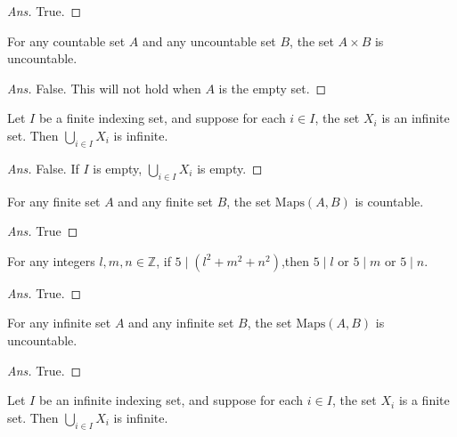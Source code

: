 \documentclass[12pt]{article}
\newenvironment{problem}[2][Problem]{\begin{trivlist}
\item[\hskip \labelsep {\bfseries #1}\hskip \labelsep {\bfseries #2.}]}{\end{trivlist}}
\begin{document}
\begin{proof}[Ans]
True.
\end{proof}

\begin{problem}{51}
For any countable set $A$ and any uncountable set $B$, the set $A\times B$ is uncountable.
\end{problem}

\begin{proof}[Ans]
False. This will not hold when $A$ is the empty set.
\end{proof}

\begin{problem}{52}
Let $I$ be a finite indexing set, and suppose for each $i \in I$, the set $X_i$ is an infinite set. Then $\bigcup_{i \in I} X_i$ is infinite.
\end{problem}

\begin{proof}[Ans]
False. If $I$ is empty, $\bigcup_{i \in I} X_i$ is empty.
\end{proof}

\begin{problem}{53}
For any finite set $A$ and any finite set $B$, the set $\text{Maps}(A, B)$ is countable.
\end{problem}

\begin{proof}[Ans]
True
\end{proof}

\begin{problem}{54}
For any integers $l, m, n \in \mathbb{Z}$, if $5 \mid (l^2 + m^2 + n^2)$,then $5 \mid l$ or $5 \mid m$ or $5 \mid n$.  
\end{problem}

\begin{proof}[Ans]
True.
\end{proof}

\begin{problem}{55}
For any infinite set $A$ and any infinite set $B$, the set $\text{Maps}(A, B)$ is uncountable.
\end{problem}

\begin{proof}[Ans]
True.
\end{proof}

\begin{problem}{56}
Let $I$ be an infinite indexing set, and suppose for each $i \in I$, the set $X_i$ is a finite set. Then $\bigcup_{i \in I} X_i$ is infinite.
\end{problem}
\end{document}
